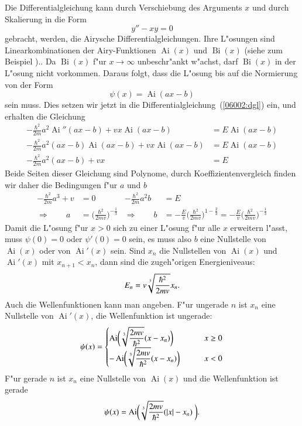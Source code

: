 \begin{loesung}
Die Differentialgleichung kann durch Verschiebung des Arguments $x$ 
und durch Skalierung in die Form
\[
y''-xy=0
\]
gebracht, werden, die Airysche Differentialgleichungen. 
Ihre L"osungen sind Linearkombinationen der Airy-Funktionen
$\operatorname{Ai}(x)$ und $\operatorname{Bi}(x)$ (siehe zum Beispiel
\cite{skript:airy})..
Da $\operatorname{Bi}(x)$ f"ur $x\to\infty$ unbeschr"ankt
w"achst, darf $\operatorname{Bi}(x)$ in der L"osung nicht
vorkommen.
Daraus folgt, dass die L"osung bis auf die Normierung von der
Form
\[
\psi(x)=\operatorname{Ai}(ax-b)
\]
sein muss.
Dies setzen wir jetzt in die Differentialgleichung~(\ref{06002:dgl}) ein,
und erhalten die Gleichung
\begin{align*}
-\frac{\hbar^2}{2m}a^2\operatorname{Ai}''(ax-b)
+
vx\operatorname{Ai}(ax-b)
&=
E\operatorname{Ai}(ax-b)
\\
-\frac{\hbar^2}{2m}a^2(ax-b)\operatorname{Ai}(ax-b)
+
vx\operatorname{Ai}(ax-b)
&=
E\operatorname{Ai}(ax-b)
\\
-\frac{\hbar^2}{2m}a^2(ax-b)
+
vx
&=
E
\end{align*}
Beide Seiten dieser Gleichung sind Polynome, durch Koeffizientenvergleich
finden wir daher die Bedingungen f"ur $a$ und $b$
\begin{align*}
-\frac{\hbar^2}{2m}a^3+v&=0
&
-\frac{\hbar^2}{2m}a^2b&=E
\\
\Rightarrow\qquad
a &= \biggl(\frac{\hbar^2}{2mv}\biggr)^{-\frac13}
&
\Rightarrow\qquad
b &= -\frac{E}{v}\biggl(\frac{\hbar^2}{2mv}\biggr)^{1-\frac23}
= -\frac{E}{v}\biggl(\frac{\hbar^2}{2mv}\biggr)^{-\frac13}
\end{align*}
Damit die L"osung f"ur $x>0$ sich zu einer L"osung f"ur alle $x$
erweitern l"asst, muss $\psi(0)=0$ oder $\psi'(0)=0$ sein,
es muss also $b$ eine Nullstelle von $\operatorname{Ai}(x)$ oder
von $\operatorname{Ai}'(x)$ sein.
Sind $x_n$ die Nullstellen von $\operatorname{Ai}(x)$ und
$\operatorname{Ai}'(x)$ mit $x_{n+1}<x_n$, dann sind die zugeh"origen
Energieniveaus:
\[
E_n=v\root 3\of{\frac{\hbar^2}{2mv}} x_n.
\]
Auch die Wellenfunktionen kann man angeben.
F"ur ungerade $n$ ist $x_n$ eine Nullstelle von $\operatorname{Ai}'(x)$,
die Wellenfunktion ist ungerade:
\begin{equation}
\psi(x)
=
\begin{cases}
\displaystyle
\operatorname{Ai}\biggl( \root3\of{\frac{2mv}{\hbar^2}} (x-x_n)\biggr)
	&\qquad x\ge 0\\
\displaystyle
-\operatorname{Ai}\biggl( \root3\of{\frac{2mv}{\hbar^2}}(x-x_n)\biggr)
	&\qquad x < 0
\end{cases}
\end{equation}
F"ur gerade $n$ ist $x_n$ eine Nullstelle von $\operatorname{Ai}(x)$
und die Wellenfunktion ist gerade
\begin{equation}
\psi(x)
=
\operatorname{Ai}\biggl( \root3\of{\frac{2mv}{\hbar^2}}(|x|-x_n) \biggr).
\end{equation}
\end{loesung}

